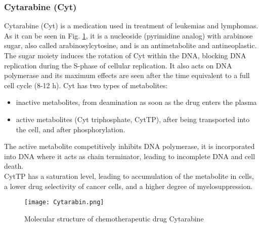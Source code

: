 \subsubsection{Cytarabine (Cyt)}
Cytarabine (Cyt) is a medication used in treatment of leukemias and lymphomas. As it can be seen in Fig. \ref{fig:Cyt}, it is a nucleoside (pyrimidine analog) with arabinose sugar, also called arabinosylcytosine, and is an antimetabolite and antineoplastic.
The sugar moiety induces the rotation of Cyt within the DNA, blocking DNA replication during the S-phase of cellular replication. It also acts on DNA polymerase and its maximum effects are seen after the time equivalent to a full cell cycle (8-12 h).
Cyt has two types of metabolites: 
\begin{itemize}
	\item inactive metabolites, from deamination as soon as the drug enters the plasma
	\item active metabolites (Cyt triphosphate, CytTP), after being transported into the cell, and after phosphorylation.
\end{itemize}
The active metabolite competitively inhibits DNA polymerase, it is incorporated into DNA where it acts as chain terminator, leading to incomplete DNA and cell death.\\
CytTP has a saturation level, leading to accumulation of the metabolite in cells, a lower drug selectivity of cancer cells, and a higher degree of myelosuppression.\cite{cyt-1, cyt-2}
\begin{figure}[htbp!]
	\centering
	\texttt{[image: Cytarabin.png]}
	\caption{Molecular structure of chemotherapeutic drug Cytarabine}
	\label{fig:Cyt}
\end{figure}


